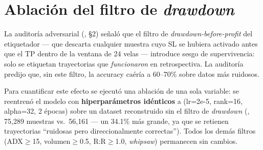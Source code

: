 %
%

\section{Ablaci\'on del filtro de \textit{drawdown}}
\label{sec:ablation-drawdown}

La auditor\'ia adversarial (, \S2) se\~nal\'o que el filtro de \textit{drawdown-before-profit} del etiquetador --- que descarta cualquier muestra cuyo SL se hubiera activado antes que el TP dentro de la ventana de 24 velas --- introduce sesgo de supervivencia: solo se etiquetan trayectorias que \textit{funcionaron} en retrospectiva. La auditor\'ia predijo que, sin este filtro, la accuracy ca\'er\'ia a 60--70\% sobre datos m\'as ruidosos.

Para cuantificar este efecto se ejecut\'o una ablaci\'on de una sola variable: se reentren\'o el modelo con \textbf{hiperpar\'ametros id\'enticos} a  (lr=2e-5, rank=16, alpha=32, 2 \'epocas) sobre un dataset reconstruido sin el filtro de \textit{drawdown} (, 75,289 muestras vs.\ 56,161 --- un 34.1\% m\'as grande, ya que se retienen trayectorias ``ruidosas pero direccionalmente correctas''). Todos los dem\'as filtros (ADX$\geq$15, volumen$\geq$0.5, R:R$\geq$1.0, \textit{whipsaw}) permanecen sin cambios.

